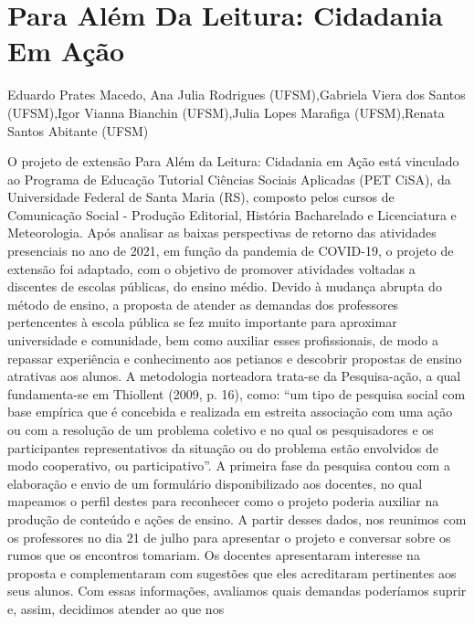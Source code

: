 


\section*{Para Além Da Leitura: Cidadania Em Ação}

Eduardo Prates Macedo, Ana Julia Rodrigues (UFSM),Gabriela Viera dos Santos (UFSM),Igor Vianna Bianchin (UFSM),Julia Lopes Marafiga (UFSM),Renata Santos Abitante (UFSM)

O projeto de extensão Para Além da Leitura: Cidadania em Ação está vinculado ao Programa de 
Educação Tutorial Ciências Sociais Aplicadas (PET CiSA), da Universidade Federal de Santa 
Maria (RS), composto pelos cursos de Comunicação Social - Produção Editorial, História 
Bacharelado e Licenciatura e Meteorologia. Após analisar as baixas perspectivas de retorno das 
atividades presenciais no ano de 2021, em função da pandemia de COVID-19, o projeto de 
extensão foi adaptado, com o objetivo de promover atividades voltadas a discentes de escolas 
públicas, do ensino médio. Devido à mudança abrupta do método de ensino, a proposta de atender 
as demandas dos professores pertencentes à escola pública se fez muito importante para aproximar 
universidade e comunidade, bem como auxiliar esses profissionais, de modo a repassar experiência 
e conhecimento aos petianos e descobrir propostas de ensino atrativas aos alunos.
A metodologia norteadora trata-se da Pesquisa-ação, a qual fundamenta-se em Thiollent (2009, p. 
16), como: “um tipo de pesquisa social com base empírica que é concebida e realizada em estreita 
associação com uma ação ou com a resolução de um problema coletivo e no qual os pesquisadores 
e os participantes representativos da situação ou do problema estão envolvidos de modo 
cooperativo, ou participativo”. A primeira fase da pesquisa contou com a elaboração e envio de 
um formulário disponibilizado aos docentes, no qual mapeamos o perfil destes para reconhecer 
como o projeto poderia auxiliar na produção de conteúdo e ações de ensino. A partir desses dados, 
nos reunimos com os professores no dia 21 de julho para apresentar o projeto e conversar sobre os 
rumos que os encontros tomariam. Os docentes apresentaram interesse na proposta e 
complementaram com sugestões que eles acreditaram pertinentes aos seus alunos. Com essas 
informações, avaliamos quais demandas poderíamos suprir e, assim, decidimos atender ao que nos 
